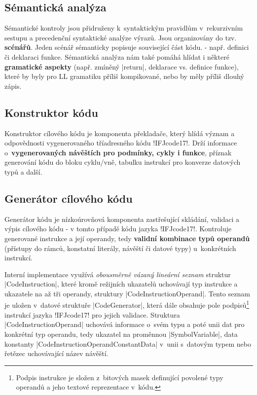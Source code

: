 \subsection{Sémantická analýza}
Sémantické kontroly jsou přidruženy k~syntaktickým pravidlům v~rekurzivním sestupu a
precedenční syntaktické analýze výrazů. Jsou organizovány do tzv. \textbf{scénářů}. Jeden scénář
sémanticky popisuje související část kódu. - např. definici
či deklaraci funkce. Sémantická analýza nám také pomáhá hlídat i některé \textbf{gramatické aspekty} (např. zmíněný \ic|return|, deklarace vs. definice funkce),
které by byly pro LL gramatiku příliš kompikované, nebo by měly příliš dlouhý zápis.

\subsection{Konstruktor kódu}
\label{subsec:code-constructor}
Konstruktor cílového kódu je komponenta překladače, který hlídá význam a odpovědnosti vygenerovaného tříadresného kódu \ic!IFJcode17!. Drží informace o~\textbf{vygenerovaných návěštích pro podmínky, cykly i funkce}, příznak generování kódu do bloku cyklu/vně, tabulku instrukcí pro konverze datových typů a další.

\subsection{Generátor cílového kódu}
Generátor kódu je nízkoúrovňová komponenta zastřešující skládání, validaci a výpis cílového kódu - v tomto případě kódu jazyka \ic!IFJcode17!.
Kontroluje generované instrukce a její operandy, tedy \textbf{validní kombinace typů operandů} (přístupy do rámců, konstatní
literály, návěští či datové typy) u~konkrétních instrukcí.

Interní implementace využívá \emph{obousměrně vázaný lineární seznam} struktur \ic|CodeInstruction|, které kromě
režijních ukazatelů uchovávají typ instrukce a ukazatele na až tři operandy, struktury \ic|CodeInstructionOperand|.
Tento seznam je uložen v~datové struktuře \ic|CodeGenerator|, která dále obsahuje pole podpisů\footnote{
    Podpis instrukce je složen z~bitových masek definující povolené typy operandů a jeho textové reprezentace v~kódu.
} instrukcí jazyka \ic!IFJcode17! pro jejich validace.
Struktura \ic|CodeInstructionOperand| uchovává informace o~svém typu a poté unii dat pro konkrétní typ operandu, tedy
ukazatel na proměnnou \ic|SymbolVariable|,
data konstanty \ic|CodeInstructionOperandConstantData| v~unii s~datovým typem nebo řetězec uchovávající název návěští.

